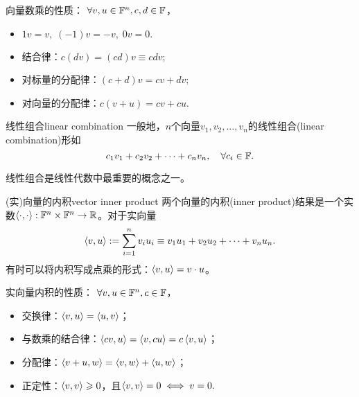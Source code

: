 \begin{corollary}
	向量数乘的性质：%
	$\forall v,u\in\mathbb F^n,c,d\in\mathbb F$，
    \begin{itemize}
    	\item $1v=v,\;(-1)v=-v,\;0v=0.$
    	\item 结合律：$c(dv)=(cd)v\equiv cdv;$
    	\item 对标量的分配律：$(c+d)v=cv+dv;$
    	\item 对向量的分配律：$c(v+u)=cv+cu.$
    \end{itemize}
\end{corollary}

\begin{definition}{线性组合}{linear combination}
	一般地，$n$个向量$v_1,v_2,\ldots,v_n$的线性组合(linear combination)形如
	\[
		c_1v_1+c_2v_2+\cdots+c_nv_n,\quad\forall c_i\in\mathbb F.
	\]
\end{definition}

\begin{remark}
	线性组合是线性代数中最重要的概念之一。
\end{remark}

\begin{definition}{(实)向量的内积}{vector inner product}
	两个向量的内积(inner product)结果是一个实数$\left\langle \cdot,\cdot\right\rangle:\mathbb F^n\times\mathbb F^n\to\mathbb R$。对于实向量
	\begin{equation}
		\left\langle v,u\right\rangle:=\sum_{i=1}^nv_iu_i\equiv v_1u_1+v_2u_2+\cdots+v_nu_n.
	\end{equation}
	有时可以将内积写成点乘的形式：$\left\langle v,u\right\rangle=v\cdot u$。
\end{definition}

\begin{corollary}
	实向量内积的性质：%
	$\forall v,u\in\mathbb F^n,c\in\mathbb F$，
    \begin{itemize}
    	\item 交换律：$\left\langle v,u\right\rangle=\left\langle u,v\right\rangle$；
    	\item 与数乘的结合律：$\left\langle cv,u\right\rangle=\left\langle v,cu\right\rangle=c\left\langle v,u\right\rangle$；
    	\item 分配律：$\left\langle v+u,w\right\rangle=\left\langle v,w\right\rangle+\left\langle u,w\right\rangle$；
    	\item 正定性：$\left\langle v,v\right\rangle\geqslant 0$，且$\left\langle v,v\right\rangle=0\iff v=0.$
    \end{itemize}
\end{corollary}

